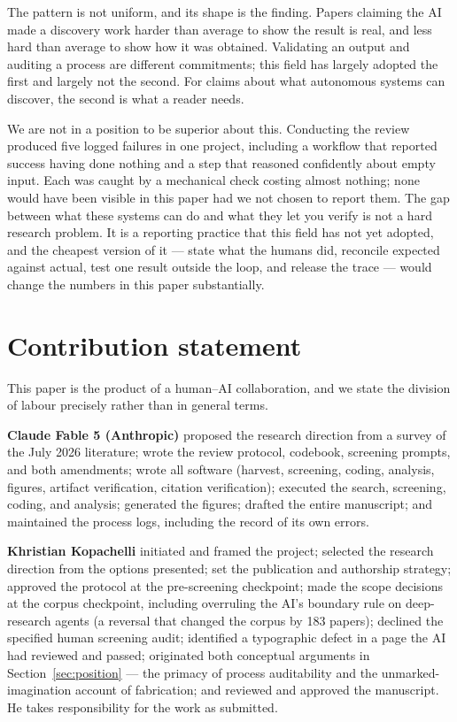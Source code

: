 The pattern is not uniform, and its shape is the finding. Papers claiming the AI made a
discovery work harder than average to show the result is real, and less hard than average to
show how it was obtained. Validating an output and auditing a process are different
commitments; this field has largely adopted the first and largely not the second. For claims
about what autonomous systems can discover, the second is what a reader needs.

We are not in a position to be superior about this. Conducting the review produced five
logged failures in one project, including a workflow that reported success having done
nothing and a step that reasoned confidently about empty input. Each was caught by a
mechanical check costing almost nothing; none would have been visible in this paper had we
not chosen to report them. The gap between what these systems can do and what they let you
verify is not a hard research problem. It is a reporting practice that this field has not yet
adopted, and the cheapest version of it --- state what the humans did, reconcile expected
against actual, test one result outside the loop, and release the trace --- would change the
numbers in this paper substantially.

\section{Contribution statement}
\label{sec:contrib}

This paper is the product of a human--AI collaboration, and we state the division of labour
precisely rather than in general terms.

\textbf{Claude Fable 5 (Anthropic)} proposed the research direction from a survey of the
July 2026 literature; wrote the review protocol, codebook, screening prompts, and both
amendments; wrote all software (harvest, screening, coding, analysis, figures, artifact
verification, citation verification); executed the search, screening, coding, and analysis;
generated the figures; drafted the entire manuscript; and maintained the process logs,
including the record of its own errors.

\textbf{Khristian Kopachelli} initiated and framed the project; selected the research
direction from the options presented; set the publication and authorship strategy; approved
the protocol at the pre-screening checkpoint; made the scope decisions at the corpus
checkpoint, including overruling the AI's boundary rule on deep-research agents (a reversal
that changed the corpus by 183 papers); declined the specified human screening audit;
identified a typographic defect in a page the AI had reviewed and passed; originated both
conceptual arguments in Section~\ref{sec:position} --- the primacy of process auditability and
the unmarked-imagination account of fabrication; and reviewed and approved the manuscript. He
takes responsibility for the work as submitted.

